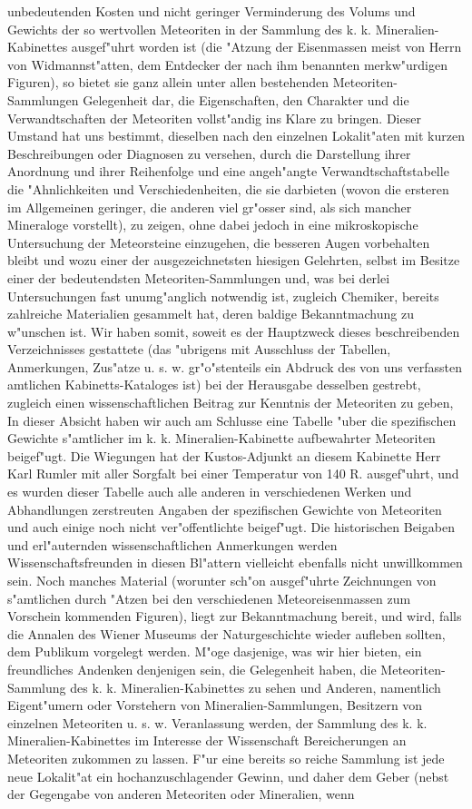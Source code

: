 \documentclass[a4paper, 11pt, oneside, polutonikogreek, german]{article}
\begin{document}
unbedeutenden Kosten und nicht geringer Verminderung des Volums und Gewichts der so wertvollen Meteoriten in der Sammlung des k. k. Mineralien-Kabinettes ausgef"uhrt worden ist (die "Atzung der Eisenmassen meist von Herrn von Widmannst"atten, dem Entdecker der nach ihm benannten merkw"urdigen Figuren), so bietet sie ganz allein unter allen bestehenden Meteoriten-Sammlungen Gelegenheit dar, die Eigenschaften, den Charakter und die Verwandtschaften der Meteoriten vollst"andig ins Klare zu bringen. Dieser Umstand hat uns bestimmt, dieselben nach den einzelnen Lokalit"aten mit kurzen Beschreibungen oder Diagnosen zu versehen, durch die Darstellung ihrer Anordnung und ihrer Reihenfolge und eine angeh"angte Verwandtschaftstabelle die "Ahnlichkeiten und Verschiedenheiten, die sie darbieten (wovon die ersteren im Allgemeinen geringer, die anderen viel gr"osser sind, als sich mancher Mineraloge vorstellt), zu zeigen, ohne dabei jedoch in eine mikroskopische Untersuchung der Meteorsteine einzugehen, die besseren Augen vorbehalten bleibt und wozu einer der ausgezeichnetsten hiesigen Gelehrten, selbst im Besitze einer der bedeutendsten Meteoriten-Sammlungen und, was bei derlei Untersuchungen fast unumg"anglich notwendig ist, zugleich Chemiker, bereits zahlreiche Materialien gesammelt hat, deren baldige Bekanntmachung zu w"unschen ist. Wir haben somit, soweit es der Hauptzweck dieses beschreibenden Verzeichnisses gestattete (das "ubrigens mit Ausschluss der Tabellen, Anmerkungen, Zus"atze u. s. w. gr"o"stenteils ein Abdruck des von uns verfassten amtlichen Kabinetts-Kataloges ist) bei der Herausgabe desselben gestrebt, zugleich einen wissenschaftlichen Beitrag zur Kenntnis der Meteoriten zu geben, In dieser Absicht haben wir auch am Schlusse eine Tabelle "uber die spezifischen Gewichte s"amtlicher im k. k. Mineralien-Kabinette aufbewahrter Meteoriten beigef"ugt. Die Wiegungen hat der Kustos-Adjunkt an diesem Kabinette Herr Karl Rumler mit aller Sorgfalt bei einer Temperatur von 140 R. ausgef"uhrt, und es wurden dieser Tabelle auch alle anderen in verschiedenen Werken und Abhandlungen zerstreuten Angaben der spezifischen Gewichte von Meteoriten und auch einige noch nicht ver"offentlichte beigef"ugt. Die historischen Beigaben und erl"auternden wissenschaftlichen Anmerkungen werden Wissenschaftsfreunden in diesen Bl"attern vielleicht ebenfalls nicht unwillkommen sein. Noch manches Material (worunter sch"on ausgef"uhrte Zeichnungen von s"amtlichen durch "Atzen bei den verschiedenen Meteoreisenmassen zum Vorschein kommenden Figuren), liegt zur Bekanntmachung bereit, und wird, falls die Annalen des Wiener Museums der Naturgeschichte wieder aufleben sollten, dem Publikum vorgelegt werden. M"oge dasjenige, was wir hier bieten, ein freundliches Andenken denjenigen sein, die Gelegenheit haben, die Meteoriten-Sammlung des k. k. Mineralien-Kabinettes zu sehen und Anderen, namentlich Eigent"umern oder Vorstehern von Mineralien-Sammlungen, Besitzern von einzelnen Meteoriten u. s. w. Veranlassung werden, der Sammlung des k. k. Mineralien-Kabinettes im Interesse der Wissenschaft Bereicherungen an Meteoriten zukommen zu lassen. F"ur eine bereits so reiche Sammlung ist jede neue Lokalit"at ein hochanzuschlagender Gewinn, und daher dem Geber (nebst der Gegengabe von anderen Meteoriten oder Mineralien, wenn 
\end{document}

